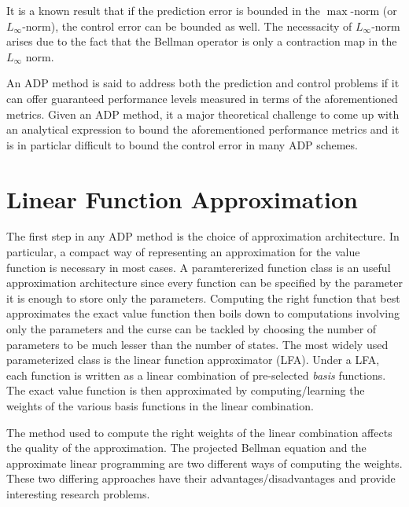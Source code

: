 It is a known result that if the prediction error is bounded in the $\max$-norm (or $L_\infty$-norm), the control error can be bounded as well. The necessacity of $L_\infty$-norm  arises due to the fact that the Bellman operator is only a contraction map in the $L_\infty$ norm.\par
An ADP method is said to address both the prediction and control problems if it can offer guaranteed performance levels measured in terms of the aforementioned metrics. Given an ADP method, it a major theoretical challenge to come up with an analytical expression to bound the aforementioned performance metrics and it is in particlar difficult to bound the control error in many ADP schemes.\par
\section{Linear Function Approximation}
The first step in any ADP method is the choice of approximation architecture. In particular, a compact way of representing an approximation for the value function is necessary in most cases. A paramtererized function class is an useful approximation architecture since every function can be specified by the parameter it is enough to store only the parameters. Computing the right function that best approximates the exact value function then boils down to computations involving only the parameters and the curse can be tackled by choosing the number of parameters to be much lesser than the number of states. The most widely used parameterized class is the linear function approximator (LFA). Under a LFA, each function is written as a linear combination of pre-selected \emph{basis} functions. The exact value function is then approximated by computing/learning the weights of the various basis functions in the linear combination.\par
The method used to compute the right weights of the linear combination affects the quality of the approximation. The projected Bellman equation and the approximate linear programming are two different ways of computing the weights. These two differing approaches have their advantages/disadvantages and provide interesting research problems.
